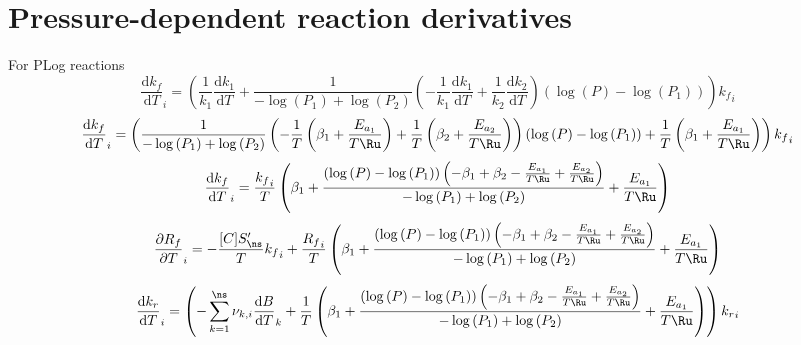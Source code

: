 \documentclass[a4paper,10pt]{article}
\begin{document}
\section{Pressure-dependent reaction derivatives}
For PLog reactions
\begin{dmath} \frac{\text{d} {k_f} }{\text{d} T }_{i} = \left(\frac{1}{k_{1}} \frac{\text{d} k_1 }{\text{d} T } + \frac{1}{- \log{\left (P_{1} \right )} + \log{\left (P_{2} \right )}} \left(- \frac{1}{k_{1}} \frac{\text{d} k_1 }{\text{d} T } + \frac{1}{k_{2}} \frac{\text{d} k_2 }{\text{d} T }\right) \left(\log{\left (P \right )} - \log{\left (P_{1} \right )}\right)\right) {k_f}_{i}\end{dmath} 
\begin{dmath} \frac{\text{d} {k_f} }{\text{d} T }_{i} = \left(\frac{1}{- \log{\left (P_{1} \right )} + \log{\left (P_{2} \right )}} \left(- \frac{1}{T} \left(\beta_1 + \frac{E_{a_1}}{T \Ru}\right) + \frac{1}{T} \left(\beta_2 + \frac{E_{a_2}}{T \Ru}\right)\right) \left(\log{\left (P \right )} - \log{\left (P_{1} \right )}\right) + \frac{1}{T} \left(\beta_1 + \frac{E_{a_1}}{T \Ru}\right)\right) {k_f}_{i}\end{dmath} 
\begin{dmath} \frac{\text{d} {k_f} }{\text{d} T }_{i} = \frac{{k_f}_{i}}{T} \left(\beta_1 + \frac{\left(\log{\left (P \right )} - \log{\left (P_{1} \right )}\right) \left(- \beta_1 + \beta_2 - \frac{E_{a_1}}{T \Ru} + \frac{E_{a_2}}{T \Ru}\right)}{- \log{\left (P_{1} \right )} + \log{\left (P_{2} \right )}} + \frac{E_{a_1}}{T \Ru}\right)\end{dmath} 
\begin{dmath} \frac{\partial {R_f} }{\partial T }_{i} = - \frac{[C] S^{\prime}_{\ns}}{T} {k_f}_{i} + \frac{{R_f}_{i}}{T} \left(\beta_1 + \frac{\left(\log{\left (P \right )} - \log{\left (P_{1} \right )}\right) \left(- \beta_1 + \beta_2 - \frac{E_{a_1}}{T \Ru} + \frac{E_{a_2}}{T \Ru}\right)}{- \log{\left (P_{1} \right )} + \log{\left (P_{2} \right )}} + \frac{E_{a_1}}{T \Ru}\right)\end{dmath} 
\begin{dmath} \frac{\text{d} {k_r} }{\text{d} T }_{i} = \left(- \sum_{k=1}^{\ns} \nu_{k,i} \frac{\text{d} B }{\text{d} T }_{k} + \frac{1}{T} \left(\beta_1 + \frac{\left(\log{\left (P \right )} - \log{\left (P_{1} \right )}\right) \left(- \beta_1 + \beta_2 - \frac{E_{a_1}}{T \Ru} + \frac{E_{a_2}}{T \Ru}\right)}{- \log{\left (P_{1} \right )} + \log{\left (P_{2} \right )}} + \frac{E_{a_1}}{T \Ru}\right)\right) {k_r}_{i}\end{dmath} 
\end{document}
